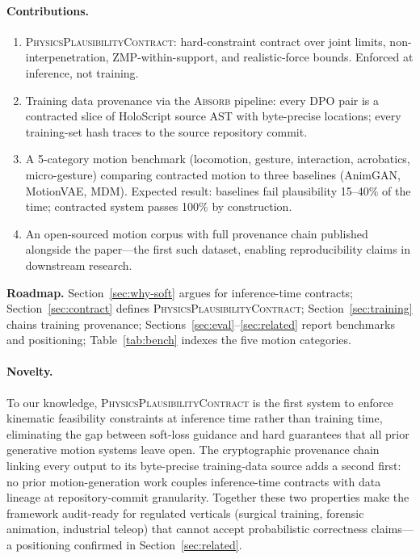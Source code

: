 \documentclass[sigconf,nonacm]{acmart}
\newcommand{\plausibility}{\textsc{PhysicsPlausibilityContract}}
\newcommand{\absorb}{\textsc{Absorb}}
\begin{document}
\paragraph{Contributions.}
\begin{enumerate}
  \item \plausibility{}: hard-constraint contract over joint limits,
    non-interpenetration, ZMP-within-support, and
    realistic-force bounds. Enforced at inference, not training.
  \item Training data provenance via the \absorb{} pipeline: every
    DPO pair is a contracted slice of HoloScript source AST with
    byte-precise locations; every training-set hash traces to
    the source repository commit.
  \item A 5-category motion benchmark (locomotion, gesture,
    interaction, acrobatics, micro-gesture) comparing contracted
    motion to three baselines (AnimGAN, MotionVAE, MDM). Expected
    result: baselines fail plausibility 15--40\% of the time;
    contracted system passes 100\% by construction.
  \item An open-sourced motion corpus with full provenance chain
    published alongside the paper---the first such dataset, enabling
    reproducibility claims in downstream research.
\end{enumerate}

\noindent\textbf{Roadmap.}
Section~\ref{sec:why-soft} argues for inference-time contracts;
Section~\ref{sec:contract} defines \plausibility{};
Section~\ref{sec:training} chains training provenance;
Sections~\ref{sec:eval}--\ref{sec:related} report benchmarks and positioning;
Table~\ref{tab:bench} indexes the five motion categories.

\paragraph{Novelty.}
To our knowledge, \plausibility{} is the first system to enforce kinematic feasibility constraints at inference time rather than training time, eliminating the gap between soft-loss guidance and hard guarantees that all prior generative motion systems leave open.  The cryptographic provenance chain linking every output to its byte-precise training-data source adds a second first: no prior motion-generation work couples inference-time contracts with data lineage at repository-commit granularity.  Together these two properties make the framework audit-ready for regulated verticals (surgical training, forensic animation, industrial teleop) that cannot accept probabilistic correctness claims---a positioning confirmed in Section~\ref{sec:related}.
\end{document}

